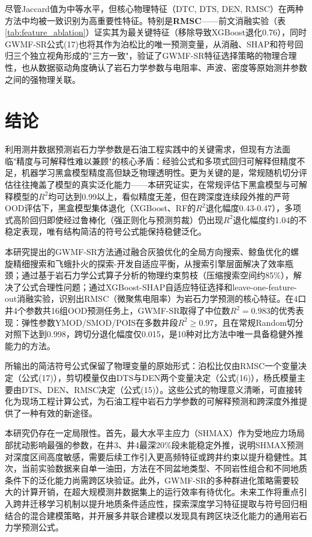 \documentclass[a4paper,12pt]{ctexart}
\begin{document}
尽管Jaccard值为中等水平，但核心物理特征（DTC, DTS, DEN, RMSC）在两种方法中均被一致识别为高重要性特征。特别是\textbf{RMSC}——前文消融实验（表\ref{tab:feature_ablation}）证实其为最关键特征（移除导致XGBoost退化0.76），同时GWMF-SR公式(17)也将其作为泊松比的唯一预测变量，从消融、SHAP和符号回归三个独立视角形成的"三方一致"，验证了GWMF-SR特征选择策略的物理合理性，也从数据驱动角度确认了岩石力学参数与电阻率、声波、密度等原始测井参数之间的强物理关联。

\section{结论}

利用测井数据预测岩石力学参数是石油工程实践中的关键需求，但现有方法面临"精度与可解释性难以兼顾"的核心矛盾：经验公式和多项式回归可解释但精度不足，机器学习黑盒模型精度高但缺乏物理透明性。更为关键的是，常规随机切分评估往往掩盖了模型的真实泛化能力——本研究证实，在常规评估下黑盒模型与可解释模型的$R^2$均可达到0.99以上，看似精度无差，但在跨深度连续段外推的严苛OOD评估下，黑盒模型集体退化（XGBoost、RF的$R^2$退化幅度0.43-0.47），多项式高阶回归即使经过鲁棒化（强正则化与预测剪裁）仍出现$R^2$退化幅度约1.04的不稳定表现，唯有结构简洁的符号公式能保持稳健泛化。

本研究提出的GWMF-SR方法通过融合灰狼优化的全局方向搜索、鲸鱼优化的螺旋精细搜索和飞蛾扑火的探索-开发自适应平衡，从搜索引擎层面解决了效率瓶颈；通过基于岩石力学公式算子分析的物理约束剪枝（压缩搜索空间约85\%），解决了公式合理性问题；通过XGBoost-SHAP自适应特征选择和leave-one-feature-out消融实验，识别出RMSC（微聚焦电阻率）为岩石力学预测的核心特征。在4口井4个参数共16组OOD预测任务上，GWMF-SR取得了中位数$R^2=0.983$的优秀表现：弹性参数YMOD/SMOD/POIS在多数井段$R^2 \geq 0.97$，且在常规Random切分对照下达到0.998，跨切分退化幅度仅0.015，是10种对比方法中唯一具备稳健外推能力的方法。

所输出的简洁符号公式保留了物理变量的原始形式：泊松比仅由RMSC一个变量决定（公式(17)），剪切模量仅由DTS与DEN两个变量决定（公式(16)），杨氏模量主要由DTS、DEN、RMSC决定（公式(15)）。这些公式的物理意义清晰，可直接转化为现场工程计算公式，为石油工程中岩石力学参数的可解释预测和跨深度外推提供了一种有效的新途径。

本研究仍存在一定局限性。首先，最大水平主应力（SHMAX）作为受地应力场局部扰动影响最强的参数，在井3、井4最深20\%段未能稳定外推，说明SHMAX预测对深度区间高度敏感，需要后续工作引入更高频特征或跨井约束以提升稳健性。其次，当前实验数据来自单一油田，方法在不同盆地类型、不同岩性组合和不同地质条件下的泛化能力尚需跨区块验证。此外，GWMF-SR的多种群进化策略需要较大的计算开销，在超大规模测井数据集上的运行效率有待优化。未来工作将重点引入跨井迁移学习机制以提升地质条件适应性，探索深度学习特征提取与符号回归相结合的混合建模策略，并开展多井联合建模以发现具有跨区块泛化能力的通用岩石力学预测公式。
\end{document}
